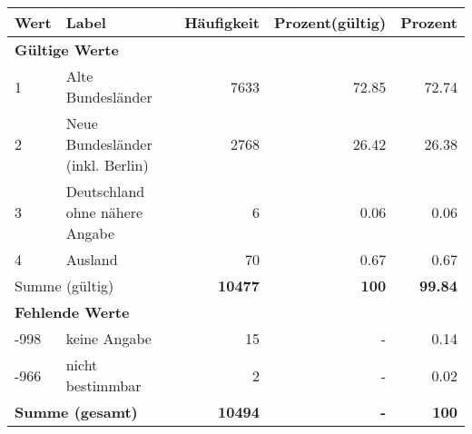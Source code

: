      \begin{longtable}{lXrrr}
     \toprule
     \textbf{Wert} & \textbf{Label} & \textbf{Häufigkeit} & \textbf{Prozent(gültig)} & \textbf{Prozent} \\
     \endhead
     \midrule
     \multicolumn{5}{l}{\textbf{Gültige Werte}}\\

     1 &
     \multicolumn{1}{X}{ Alte Bundesländer   } &


       \num{7633} &
       \num[round-mode=places,round-precision=2]{72.85} &
         \num[round-mode=places,round-precision=2]{72.74} \\

     2 &
     \multicolumn{1}{X}{ Neue Bundesländer (inkl. Berlin)   } &


       \num{2768} &
       \num[round-mode=places,round-precision=2]{26.42} &
         \num[round-mode=places,round-precision=2]{26.38} \\

     3 &
     \multicolumn{1}{X}{ Deutschland ohne nähere Angabe   } &


       \num{6} &
       \num[round-mode=places,round-precision=2]{0.06} &
         \num[round-mode=places,round-precision=2]{0.06} \\

     4 &
     \multicolumn{1}{X}{ Ausland   } &


       \num{70} &
       \num[round-mode=places,round-precision=2]{0.67} &
         \num[round-mode=places,round-precision=2]{0.67} \\
     \midrule
     \multicolumn{2}{l}{Summe (gültig)} &
       \textbf{\num{10477}} &
     \textbf{\num{100}} &
       \textbf{\num[round-mode=places,round-precision=2]{99.84}} \\
     \multicolumn{5}{l}{\textbf{Fehlende Werte}}\\
       -998 &
       keine Angabe &
         \num{15} &
        - &
         \num[round-mode=places,round-precision=2]{0.14} \\
       -966 &
       nicht bestimmbar &
         \num{2} &
        - &
         \num[round-mode=places,round-precision=2]{0.02} \\
     \midrule
     \multicolumn{2}{l}{\textbf{Summe (gesamt)}} &
          \textbf{\num{10494}} &
        \textbf{-} &
        \textbf{\num{100}} \\
     \bottomrule
     \end{longtable}
     

